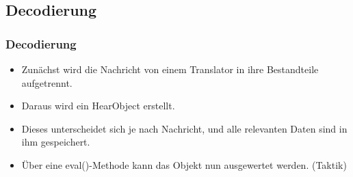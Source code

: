 %  
%
%  

\subsection{Decodierung}
\frame
{
  \frametitle{Decodierung}
  
  \begin{itemize}
    \item Zun\"achst wird die Nachricht von einem Translator in ihre Bestandteile aufgetrennt.
    \item Daraus wird ein HearObject erstellt.
    \item Dieses unterscheidet sich je nach Nachricht, und alle relevanten Daten sind in ihm gespeichert.
    \item \"Uber eine eval()-Methode kann das Objekt nun ausgewertet werden. (Taktik)
  \end{itemize}
}

